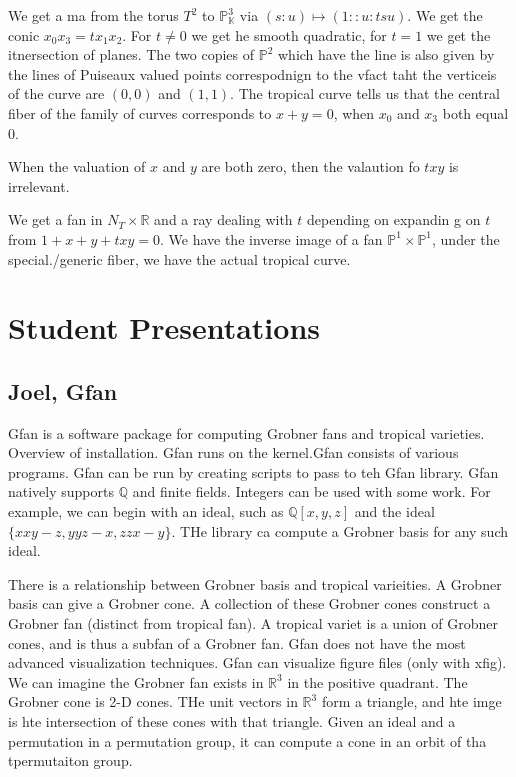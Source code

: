 \documentclass[11pt]{article}
\theoremstyle{definition}
\def\QQ{{\mathbb Q}}
\def\RR{{\mathbb R}}
\def\KK{{\mathbb K}}
\def\PP{{\mathbb P}}
\begin{document}
We get  a ma from the torus $T^2$ to $\PP_\KK^3$ via $(s:u) \mapsto (1::u:tsu)$. We get the conic $x_0x_3=tx_1x_2$. For $t\neq 0$ we get he smooth quadratic, for $t=1$ we get the itnersection of planes.
The two copies of $\PP^2$ which have the line is also given by the lines of Puiseaux valued points correspodnign to the vfact taht the verticeis of the curve are $(0,0)$ and $(1,1)$. The tropical curve tells us that the central fiber of the family of curves corresponds to $x+y=0$, when $x_0$ and $x_3$ both equal $0$.


When the valuation of $x$ and $y$ are both zero, then the valaution fo $txy$ is irrelevant.


We get a fan in $N_T \times \RR$ and a ray dealing with $t$ depending on expandin g on $t$ from $1+x+y+txy=0$. We have the inverse image of a fan $\PP^1 \times \PP^1$, under the special./generic fiber, we have the actual tropical curve.









\section{Student Presentations}

\subsection{Joel, Gfan }

Gfan is a software package for computing Grobner fans and tropical varieties. Overview of installation. Gfan runs on the kernel.Gfan consists of various programs. Gfan can be run by creating scripts to pass to teh Gfan library. Gfan natively supports $\QQ$ and finite fields. Integers can be used with some work. For example, we can begin with an ideal, such as $\QQ[x,y,z]$ and the ideal $\{xxy-z,yyz-x,zzx-y\}$. THe library ca compute a Grobner basis for any such ideal.

There is a relationship between Grobner basis and tropical varieities. A Grobner basis can give a Grobner cone. A collection of these Grobner cones construct a Grobner fan (distinct from tropical fan). A tropical variet is a union of Grobner cones, and is thus a subfan of a Grobner fan. Gfan does not have the most advanced visualization techniques. Gfan can visualize  figure files (only with xfig). We can imagine the Grobner fan exists in $\RR^3$ in the positive quadrant. The Grobner cone is 2-D cones. THe unit vectors in $\RR^3$ form a triangle, and hte imge is hte intersection of these cones with that triangle. Given an ideal and a permutation in a permutation group, it can compute a cone in an orbit of tha tpermutaiton group.
\end{document}

